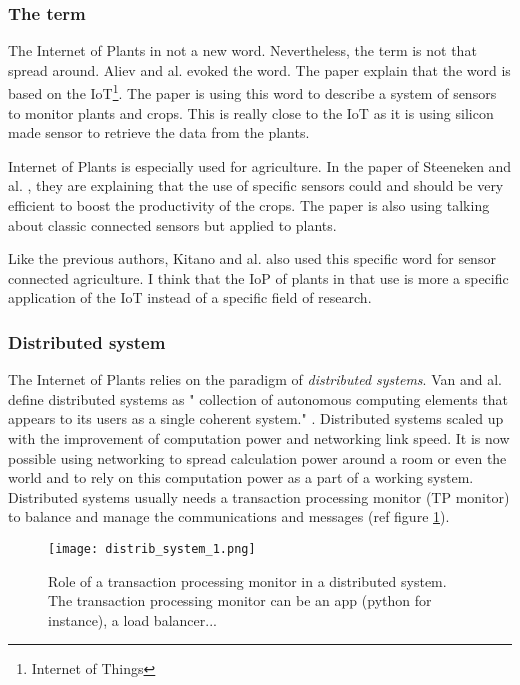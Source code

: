 \subsubsection{The term}

The Internet of Plants in not a new word. Nevertheless, the term is not that spread around. Aliev and al. \cite{alievInternetPlantsApplication2018} evoked the word. The paper explain that the word is based on the IoT\footnote{Internet of Things}. The paper is using this word to describe a system of sensors to monitor plants and crops. This is really close to the IoT as it is using silicon made sensor to retrieve the data from the plants.

Internet of Plants is especially used for agriculture. In the paper of Steeneken and al. \cite{steenekenSensorsAgricultureInternet2023}, they are explaining that the use of specific sensors could and should be very efficient to boost the productivity of the crops.
The paper is also using talking about classic connected sensors but applied to plants.

Like the previous authors, Kitano and al. \cite{kitanoInternetPlantsIoP2022} also used this specific word for sensor connected agriculture. I think that the IoP of plants in that use is more a specific application of the IoT instead of a specific field of research.

\subsubsection{Distributed system}

The Internet of Plants relies on the paradigm of \textit{distributed systems}. Van and al. define distributed systems as " collection of autonomous computing elements that appears to its users as a single coherent system." \cite{steenDistributedSystems2017}.
Distributed systems scaled up with the improvement of computation power and networking link speed. It is now possible using networking to spread calculation power around a room or even the world and to rely on this computation power as a part of a working system. Distributed systems usually needs a transaction processing monitor (TP monitor) to balance and manage the communications and messages (ref figure \ref{fig:distrib_system_1}).

\begin{figure}[h!]
    \centering
    \texttt{[image: distrib\_system\_1.png]}
    \caption{Role of a transaction processing monitor in a distributed system. The transaction processing monitor can be an app (python for instance), a load balancer...}
    \vspace{0.1cm}
    \label{fig:distrib_system_1}
\end{figure}

